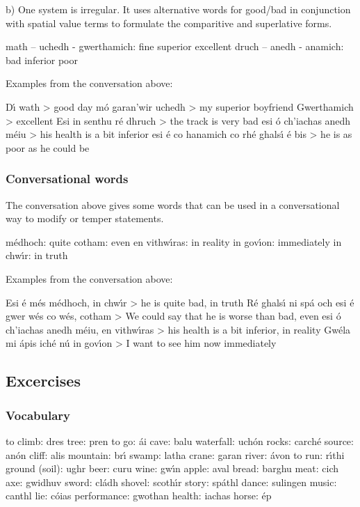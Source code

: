 b) One system is irregular. It uses alternative words for good/bad in conjunction with spatial value terms to formulate the comparitive and superlative forms.

        math –  uchedh   -  gwerthamich: fine       superior     excellent
        druch – anedh -    anamich: bad       inferior    poor

Examples from the conversation above:

D\'{\i} wath > good day
m\'{o} garan’wir uchedh > my superior boyfriend
Gwerthamich > excellent
Esi in senthu r\'{e} dhruch > the track is very bad
esi \'{o} ch’iachas anedh m\'{e}iu > his health is a bit inferior
esi \'{e} co hanamich co rh\'{e} ghals\'{\i} \'{e} bis > he is as poor as he could be

\subsubsection{Conversational words}

The conversation above gives some words that can be used in a conversational way to modify or temper statements.

m\'{e}dhoch: quite
cotham: even
en vithw\'{\i}ras: in reality
in gov\'{\i}on: immediately
in chw\'{\i}r: in truth

Examples from the conversation above:

Esi \'{e} m\'{e}s m\'{e}dhoch, in chw\'{\i}r > he is quite bad, in truth
R\'{e} ghals\'{\i} ni sp\'{a} och esi \'{e} gwer w\'{e}s co w\'{e}s, cotham > We could say that he is worse than bad, even
esi \'{o} ch'iachas anedh m\'{e}iu, en vithw\'{\i}ras > his health is a bit inferior, in reality
Gw\'{e}la mi \'{a}pis ich\'{e} n\'{u} in gov\'{\i}on > I want to see him now immediately

\subsection{Excercises}

\subsubsection{Vocabulary}

to climb: dres
tree: pren
to go: \'{a}i
cave: balu
waterfall: uch\'{o}n
rocks: carch\'{e}
source: an\'{o}n
cliff: alis
mountain: br\'{\i}
swamp: latha
crane: garan
river: \'{a}von
to run: r\'{\i}thi
ground (soil): ughr
beer: curu
wine: gw\'{\i}n
apple: aval
bread: barghu
meat: cich
axe: gwidhuv
sword: cl\'{a}dh
shovel: scoth\'{\i}r
story: sp\'{a}thl
dance: sulingen
music: canthl
lie: c\'{o}ias
performance: gwothan
health: iachas
horse: \'{e}p

